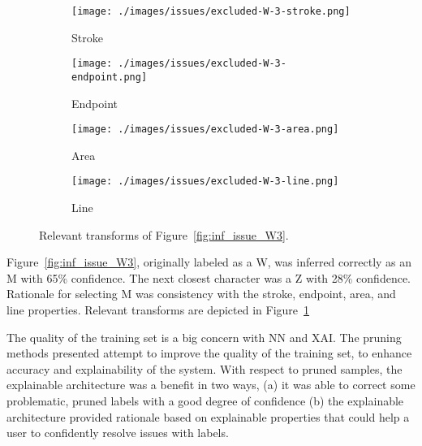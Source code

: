 \begin{figure}[H]
    \centering
    \begin{subfigure}{.20\columnwidth}
        \centering
        \texttt{[image: ./images/issues/excluded-W-3-stroke.png]}
        \caption{Stroke}
    \end{subfigure}%
    \begin{subfigure}{.20\columnwidth}
        \centering
        \texttt{[image: ./images/issues/excluded-W-3-endpoint.png]}
        \caption{Endpoint}
    \end{subfigure}%
    \begin{subfigure}{.20\columnwidth}
        \centering
        \texttt{[image: ./images/issues/excluded-W-3-area.png]}
        \caption{Area}
    \end{subfigure}%
    \begin{subfigure}{.20\columnwidth}
        \centering
        \texttt{[image: ./images/issues/excluded-W-3-line.png]}
        \caption{Line}
    \end{subfigure}%
    \caption{Relevant transforms of Figure~\ref{fig:inf_issue_W3}.}
    \label{fig:w3_trans}
\end{figure}

Figure~\ref{fig:inf_issue_W3}, originally labeled as a W, was inferred correctly
as an M with 65\% confidence. The next closest character was a Z with 28\%
confidence.  Rationale for selecting M was consistency with the stroke,
endpoint, area, and line properties.  Relevant transforms are depicted in
Figure~\ref{fig:w3_trans}


The quality of the training set is a big concern with NN and XAI.  The pruning
methods presented attempt to improve the quality of the training set, to enhance
accuracy and explainability of the system. With respect to pruned samples, the
explainable architecture was a benefit in two ways, (a) it was able to correct
some problematic, pruned labels with a good degree of confidence (b) the
explainable architecture provided rationale based on explainable properties that
could help a user to confidently resolve issues with labels.

